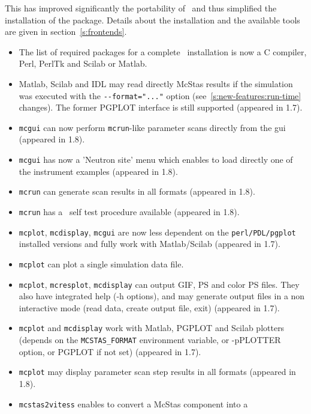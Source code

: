   This has improved significantly the portability of \MCS\ and thus simplified
  the installation of the package. Details about the installation and the
  available tools are given in section~\ref{s:frontends}.

\begin{itemize}
\item The list of required packages for a complete \MCS\ installation is now a C
    compiler, Perl, PerlTk and Scilab or Matlab.
\item Matlab, Scilab and IDL may read directly McStas results if the simulation
    was executed with the \verb+--format="..."+ option 
    (see~\ref{s:new-features:run-time} changes). The former PGPLOT interface is
    still supported (appeared in 1.7).  
          
\item\verb+mcgui+ can now perform \verb+mcrun+-like parameter scans
    directly from the gui (appeared in 1.8).
\item\verb+mcgui+ has now a 'Neutron site' menu which enables to load directly one of the
    instrument examples (appeared in 1.8).
\item \verb+mcrun+ can generate scan results in all formats (appeared in 1.8). 
\item \verb+mcrun+ has a \MCS\ self test procedure available (appeared in 1.8). 
\item \verb+mcplot+, \verb+mcdisplay+, \verb+mcgui+ are now less dependent on the
    \verb+perl/PDL/pgplot+ installed versions and fully work with Matlab/Scilab (appeared in 1.7). 
\item \verb+mcplot+ can plot a single simulation data file.
\item \verb+mcplot+, \verb+mcresplot+, \verb+mcdisplay+ can output GIF, PS and color
    PS files. They also have integrated help (-h options), and may generate output
    files in a non interactive mode (read data, create output file, exit) (appeared in 1.7).
\item \verb+mcplot+ and \verb+mcdisplay+ work with Matlab, PGPLOT and Scilab plotters
   (depends on the \verb+MCSTAS_FORMAT+ environment variable, or -pPLOTTER option, or
   PGPLOT if not set) (appeared in 1.7).
\item \verb+mcplot+ may display parameter scan step results in all formats
   (appeared in 1.8).  
\item \verb+mcstas2vitess+ enables to convert a McStas component into a

\end{itemize}
